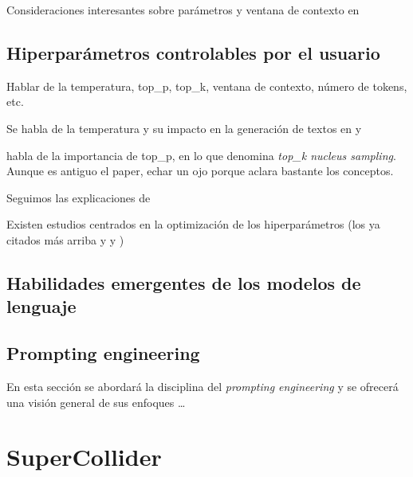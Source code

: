 Consideraciones interesantes sobre parámetros y ventana de contexto en \cite{gonzaloAsomandonosVentanaContextual2023}

\subsection{Hiperparámetros controlables por el usuario}
Hablar de la temperatura, top\_p, top\_k, ventana de contexto, número de tokens, etc. 

Se habla de la temperatura y su impacto en la generación de textos en \cite{holtzmanCuriousCaseNeural2020} y \cite{chamandFinetuneYourClassifier2022}

\cite{holtzmanCuriousCaseNeural2020} habla de la importancia de top\_p, en lo que denomina \textit{top\_k nucleus sampling}. Aunque es antiguo el paper, echar un ojo porque aclara bastante los conceptos.

Seguimos las explicaciones de \cite{rothmanTransformersNaturalLanguage2021}

Existen estudios centrados en la optimización de los hiperparámetros (los ya citados más arriba y \cite{wangCostEffectiveHyperparameterOptimization2023} y \cite{wangHyperparameterOptimizationAlgorithm2022})


\subsection{Habilidades emergentes de los modelos de lenguaje}
\subsection{Prompting engineering}
En esta sección se abordará la disciplina del \textit{prompting engineering} y se ofrecerá una visión general de sus enfoques \citep{LLMPromptingGuide}\dots


\section{SuperCollider}


